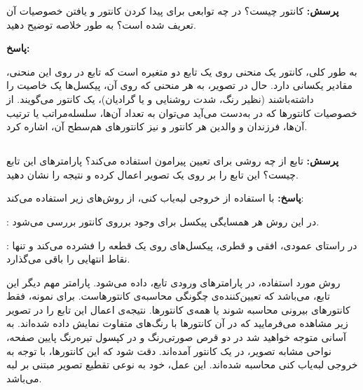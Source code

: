 \documentclass[12pt,a4paper]{article}
\theoremstyle{definition}
\theoremstyle{theorem}
\theoremstyle{definition}
\begin{document}
\textbf{پرسش: }
کانتور چیست؟ در 
چه توابعی برای پیدا کردن کانتور و یافتن خصوصیات آن تعریف شده است؟ به طور خلاصه توضیح دهید. 
 
\textbf{پاسخ: }

به طور کلی، کانتور یک منحنی روی یک تابع دو متغیره است که تابع در روی این منحنی، مقادیر یکسانی دارد. حال در تصویر، به هر منحنی که روی آن، پیکسل‌ها یک خاصیت را داشته‌باشند (نظیر رنگ، شدت روشنایی و یا گرادیان)، یک کانتور می‌گویند.
از خصوصیات کانتورها که در 
به‌دست می‌آید می‌توان به تعداد آن‌ها، سلسله‌مراتب یا ترتیب آن‌ها، فرزندان و والدین هر کانتور و نیز کانتورهای هم‌سطح آن، اشاره کرد. 
\vspace{0.5cm}
\subsection{}

\textbf{پرسش: }
تابع 
از چه روشی برای تعیین پیرامون استفاده می‌کند؟ پارامتر‌های این تابع چیست؟ این تابع را بر روی یک تصویر اعمال کرده و نتیجه را نشان دهید.
 
\textbf{پاسخ: }
با استفاده از خروجی لبه‌یاب کنی، از روش‌های زیر استفاده می‌کند:

 : در این روش هر همسایگی پیکسل برای وجود برروی کانتور بررسی می‌شود.

 : در راستای عمودی، افقی و قطری، پیکسل‌های روی یک قطعه را فشرده می‌کند و تنها نقاط انتهایی را باقی می‌گذارد.

روش مورد استفاده، در پارامترهای ورودی تابع، داده می‌شود.
پارامتر مهم دیگر این تابع، 
می‌باشد که تعیین‌کننده‌ی چگونگی محاسبه‌ی کانتورهاست. برای نمونه، فقط کانتورهای بیرونی محاسبه شوند یا همه‌ی کانتورها.
نتیجه‌ی اعمال این تابع را در تصویر زیر مشاهده می‌فرمایید که در آن کانتورها با رنگ‌های متفاوت نمایش داده‌ شده‌اند. به آسانی متوجه خواهید شد در دو قرص صورتی‌رنگ و در کپسول تیره‌رنگ پایین صفحه، نواحی مشابه تصویر، در یک کانتور آمده‌اند. دقت شود که این کانتورها، با توجه به خروجی لبه‌یاب کنی محاسبه شده‌اند.
این عمل، خود به نوعی تقطیع تصویر مبتنی بر لبه‌ می‌باشد.
\end{document}
